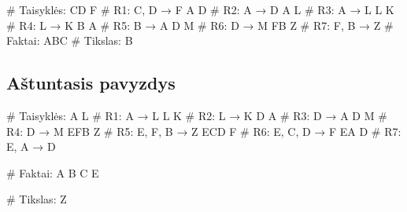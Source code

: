 \begin{pythonaienv}[fc]
# Taisyklės:
CD F                                    # R1: C, D → F
A D                                     # R2: A → D
A L                                     # R3: A → L
L K                                     # R4: L → K
B A                                     # R5: B → A
D M                                     # R6: D → M
FB Z                                    # R7: F, B → Z
# Faktai:
ABC
# Tikslas:
B
\end{pythonaienv}

\subsection{Aštuntasis pavyzdys}

\begin{pythonaienv}[fc]

# Taisyklės:
A L                                     # R1: A → L
L K                                     # R2: L → K
D A                                     # R3: D → A
D M                                     # R4: D → M
EFB Z                                   # R5: E, F, B → Z
ECD F                                   # R6: E, C, D → F
EA D                                    # R7: E, A → D

# Faktai:
A B C E

# Tikslas:
Z

\end{pythonaienv}
